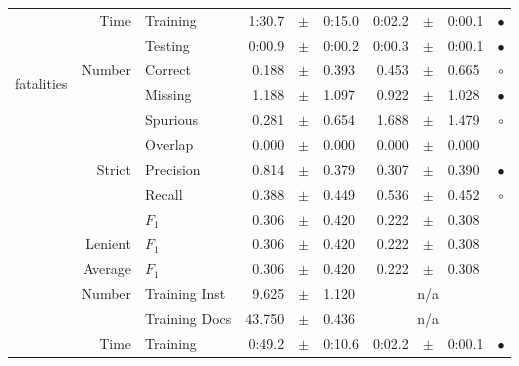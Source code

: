 \begin{longtable}{|r|r|l||rcl|rcl|c|}
\cline{2-10} & \multirow{2}{*}{      Time} &        Training &      1:30.7 &  $\pm$  &      0:15.0 &      0:02.2 &  $\pm$  &      0:00.1 & $\bullet$ \\
\cline{3-10} &                             &         Testing &      0:00.9 &  $\pm$  &      0:00.2 &      0:00.3 &  $\pm$  &      0:00.1 & $\bullet$ \\
\hline
\hline
\multirow{11}{*}{\begin{sideways}fatalities\end{sideways} }
             & \multirow{4}{*}{    Number} &         Correct &       0.188 &  $\pm$  &       0.393 &       0.453 &  $\pm$  &       0.665 & $\circ$ \\
\cline{3-10} &                             &         Missing &       1.188 &  $\pm$  &       1.097 &       0.922 &  $\pm$  &       1.028 & $\bullet$ \\
\cline{3-10} &                             &        Spurious &       0.281 &  $\pm$  &       0.654 &       1.688 &  $\pm$  &       1.479 & $\circ$ \\
\cline{3-10} &                             &         Overlap &       0.000 &  $\pm$  &       0.000 &       0.000 &  $\pm$  &       0.000 &  \\
\cline{2-10} & \multirow{3}{*}{    Strict} &       Precision &       0.814 &  $\pm$  &       0.379 &       0.307 &  $\pm$  &       0.390 & $\bullet$ \\
\cline{3-10} &                             &          Recall &       0.388 &  $\pm$  &       0.449 &       0.536 &  $\pm$  &       0.452 & $\circ$ \\
\cline{3-10} &                             &           $F_1$ &       0.306 &  $\pm$  &       0.420 &       0.222 &  $\pm$  &       0.308 &  \\
\cline{2-10} &                     Lenient &           $F_1$ &       0.306 &  $\pm$  &       0.420 &       0.222 &  $\pm$  &       0.308 &  \\
\cline{2-10} &                     Average &           $F_1$ &       0.306 &  $\pm$  &       0.420 &       0.222 &  $\pm$  &       0.308 &  \\
\cline{2-10} & \multirow{2}{*}{    Number} &   Training Inst &       9.625 &  $\pm$  &       1.120 &    \multicolumn{3}{c|}{n/a}         &  \\
\cline{3-10} &                             &   Training Docs &      43.750 &  $\pm$  &       0.436 &    \multicolumn{3}{c|}{n/a}         &  \\
\cline{2-10} & \multirow{2}{*}{      Time} &        Training &      0:49.2 &  $\pm$  &      0:10.6 &      0:02.2 &  $\pm$  &      0:00.1 & $\bullet$ \\

\end{longtable}
